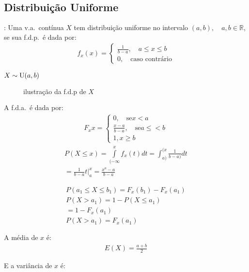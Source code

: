    \subsection{Distribuição Uniforme} 
   \begin{description}
     \item [Definição]: Uma v.a.\ contínua $X$ tem distribuição uniforme no intervalo $(a,b), \quad a,b \in \mathbb{R}$,
       se sua f.d.p.\ é dada por:
\begin{align}
  f_x(x) = \begin{cases}
\frac{1}{b-a}, \quad a \leq x \leq b  \\
   0, \quad \text{caso contrário}
  \end{cases}
\end{align}
\item[Notação] $X \sim \operatorname{U}(a,b)$
  \begin{figure}[H]
    \centering
    
    \caption{ilustração da f.d.p de $X$}
  \end{figure}
\item A f.d.a.\ é dada por:
  \begin{align}
    F_x{x} = \begin{cases}
      0, \quad \text{se} x<a \\
      \frac{x-a}{b-a}, \quad \text{se} a\leq<b\\
      1, x \ge b
    \end{cases}
  \end{align}
  \begin{align}
    P(X \leq x) = \int \limits_{(- \infty}^{x} f_{x} (t) dt = \int_{a)}^{(x} \frac{1}{b-a)} dt\\
    \nonumber = \frac{1}{b-a}t |_{a}^{x} = \frac{x^a -a}{b-a}
  \end{align}
  \begin{example}  \begin{align*}
    P(a_1 \leq X \leq b_1) = F_{x} (b_1) - F_{x}(a_1) \\
    P(X > a_1)= 1- P(X \leq a_1) \\
    = 1-F_{x} (a_1) \\
    P(X > a_1)= F_{x}(a_1)
  \end{align*}
\item A média de $x$ é:
  \begin{align*}
    E(X) = \frac{a+b}{2}
  \end{align*}
\item E a variância de $x$ é:
  \begin{align*}

\end{align*}
\end{example}
\end{description}

